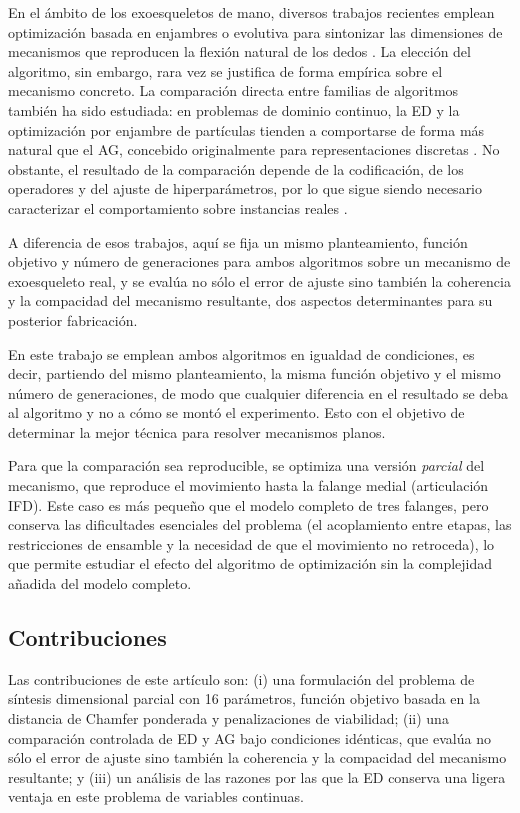 En el ámbito de los exoesqueletos de mano, diversos trabajos recientes emplean
optimización basada en enjambres o evolutiva para sintonizar las dimensiones de
mecanismos que reproducen la flexión natural de los dedos
\cite{ref_exo_review,ref_exo_stephenson}. La elección del algoritmo, sin
embargo, rara vez se justifica de forma empírica sobre el mecanismo concreto. La
comparación directa entre familias de algoritmos también ha sido estudiada: en
problemas de dominio continuo, la ED y la optimización por enjambre de partículas
tienden a comportarse de forma más natural que el AG, concebido originalmente
para representaciones discretas \cite{ref_ga_pso_de,ref_de_vs_ga}. No obstante,
el resultado de la comparación depende de la codificación, de los operadores y
del ajuste de hiperparámetros, por lo que sigue siendo necesario caracterizar el
comportamiento sobre instancias reales \cite{ref_de_survey,ref_de_sade}.

A diferencia de esos trabajos, aquí se fija un mismo planteamiento, función
objetivo y número de generaciones para ambos algoritmos sobre un mecanismo de
exoesqueleto real, y se evalúa no sólo el error de ajuste sino también la
coherencia y la compacidad del mecanismo resultante, dos aspectos determinantes
para su posterior fabricación.

En este trabajo se emplean ambos algoritmos en igualdad de condiciones, es decir,
partiendo del mismo planteamiento, la misma función objetivo y el mismo número de
generaciones, de modo que cualquier diferencia en el resultado se deba al
algoritmo y no a cómo se montó el experimento. Esto con el objetivo de determinar
la mejor técnica para resolver mecanismos planos.

Para que la comparación sea reproducible, se optimiza una versión \emph{parcial}
del mecanismo, que reproduce el movimiento hasta la falange medial (articulación
IFD). Este caso es más pequeño que el modelo completo de tres falanges, pero
conserva las dificultades esenciales del problema (el acoplamiento entre etapas,
las restricciones de ensamble y la necesidad de que el movimiento no retroceda),
lo que permite estudiar el efecto del algoritmo de optimización sin
la complejidad añadida del modelo completo.

\subsection{Contribuciones}
Las contribuciones de este artículo son: (i) una formulación del
problema de síntesis dimensional parcial con 16 parámetros, función objetivo
basada en la distancia de Chamfer ponderada y penalizaciones de viabilidad;
(ii) una comparación controlada de ED y AG bajo condiciones idénticas, que
evalúa no sólo el error de ajuste sino también la coherencia y la compacidad del
mecanismo resultante; y (iii) un análisis de las razones por las que la ED
conserva una ligera ventaja en este problema de variables continuas.
